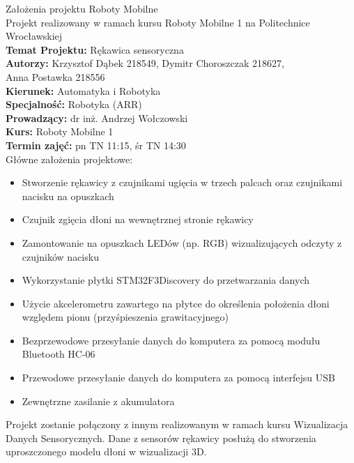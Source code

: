\documentclass[12pt,a4paper]{article}
\begin{document}
\LARGE\centering Założenia projektu Roboty Mobilne\\
\large\centering Projekt realizowany w ramach kursu Roboty Mobilne 1 na Politechnice Wrocławskiej\\
\vspace{5 mm}
\normalsize\flushleft\textbf{Temat Projektu:} Rękawica sensoryczna\\
\textbf{Autorzy:} Krzysztof Dąbek 218549, Dymitr Choroszczak 218627,\\Anna Postawka 218556\\
\textbf{Kierunek:} Automatyka i Robotyka\\
\textbf{Specjalność:} Robotyka (ARR)\\
\textbf{Prowadzący:} dr inż. Andrzej Wołczowski\\
\textbf{Kurs:} Roboty Mobilne 1\\
\textbf{Termin zajęć:} pn TN 11:15, śr TN 14:30\\
\vspace{5 mm}
\large Główne założenia projektowe: \normalsize
\begin{itemize}
\item Stworzenie rękawicy z czujnikami ugięcia w trzech palcach oraz czujnikami nacisku na opuszkach
\item Czujnik zgięcia dłoni na wewnętrznej stronie rękawicy
\item Zamontowanie na opuszkach LEDów (np. RGB) wizualizujących odczyty z czujników nacisku
\item Wykorzystanie płytki STM32F3Discovery do przetwarzania danych
\item Użycie akcelerometru zawartego na płytce do określenia położenia dłoni względem pionu (przyśpieszenia grawitacyjnego)
\item Bezprzewodowe przesyłanie danych do komputera za pomocą modułu Bluetooth HC-06
\item Przewodowe przesyłanie danych do komputera za pomocą interfejsu USB
\item Zewnętrzne zasilanie z akumulatora
\end{itemize}
Projekt zostanie połączony z innym realizowanym w ramach kursu Wizualizacja Danych Sensorycznych. Dane z sensorów rękawicy posłużą do stworzenia uproszczonego modelu dłoni w wizualizacji 3D.
\end{document}
